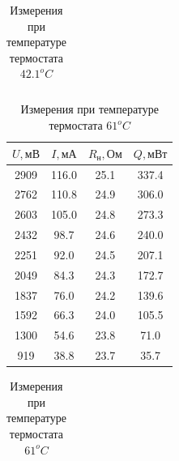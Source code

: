 \documentclass[a4paper, 12pt]{article}
\begin{document}
\begin{table}[!ht]
\begin{minipage}{.42\linewidth}
\begin{tabular}{|c|c|c|c|}
                \end{tabular}
                \caption{Измерения при температуре термостата $42.1^oC$}
                \label{table_42}
            \end{minipage}
        \end{table}

        \begin{table}[!ht]
            \begin{minipage}{.42\linewidth}
                \centering
                \begin{tabular}{|c|c|c|c|}
                    \hline

                    $U, мВ$ & $I, мА$ & $R_н, Ом$ & $Q, мВт$\\ \hline
                    2909 & 116.0 & 25.1 & 337.4\\ \hline
                    2762 & 110.8 & 24.9 & 306.0\\ \hline
                    2603 & 105.0 & 24.8 & 273.3\\ \hline
                    2432 & 98.7 & 24.6 & 240.0\\ \hline
                    2251 & 92.0 & 24.5 & 207.1\\ \hline
                    2049 & 84.3 & 24.3 & 172.7\\ \hline
                    1837 & 76.0 & 24.2 & 139.6\\ \hline
                    1592 & 66.3 & 24.0 & 105.5\\ \hline
                    1300 & 54.6 & 23.8 & 71.0\\ \hline
                    919 & 38.8 & 23.7 & 35.7\\ \hline

                \end{tabular}
                \caption{Измерения при температуре термостата $61^oC$}
                \label{table_61}
            \end{minipage}
            \begin{minipage}{.42\linewidth}
                \centering
                \begin{tabular}{|c|c|c|c|}
                    \hline


\end{tabular}
\end{minipage}
\end{table}
\end{document}
